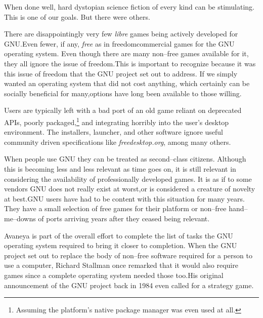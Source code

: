 When done well, hard dystopian science fiction of every kind can be stimulating. This is one of our goals. But there were others.

There are disappointingly very few {\it libre} games being actively developed for GNU. Even fewer, if any, {\it free} as in freedom commercial games for the GNU operating system. Even though there are many non--free games available for it, they all ignore the issue of freedom. This is important to recognize because it was this issue of freedom that the GNU project set out to address. If we simply wanted an operating system that did not cost anything, which certainly can be socially beneficial for many, options have long been available to those willing.\footnotecite[piratebay]

Users are typically left with a bad port of an old game reliant on deprecated APIs, poorly packaged,\footnote{Assuming the platform's native package manager was even used at all.} and integrating horribly into the user's desktop environment. The installers, launcher, and other software ignore useful community driven specifications like {\it freedesktop.org}, among many others.

When people use GNU they can be treated as second--class citizens. Although this is becoming less and less relevant as time goes on, it is still relevant in considering the availability of professionally developed games. It is as if to some vendors GNU does not really exist at worst, or is considered a creature of novelty at best. GNU users have had to be content with this situation for many years. They have a small selection of free games for their platform or non--free hand--me--downs of ports arriving years after they ceased being relevant.

Avaneya is part of the overall effort to complete the list of tasks the GNU operating system required to bring it closer to completion. When the GNU project set out to replace the body of non--free software required for a person to use a computer, Richard Stallman once remarked that it would also require games since a complete operating system needed those too.  His original announcement of the GNU project back in 1984 even called for a strategy game.

